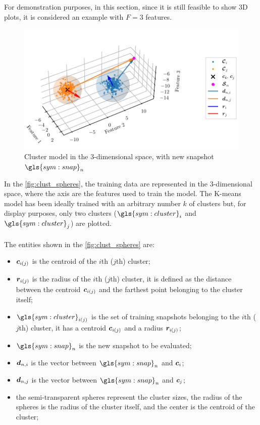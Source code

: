 For demonstration purposes, in this section, since it is still feasible to show 3D plots, it is considered an example with ${F}=3$ features.

\begin{figure}[htbp]
  \centering
  \includegraphics[width=\textwidth]{images/Spheres_2.pdf}
  \caption{Cluster model in the $3$-dimensional space, with new snapshot $\gls{sym:snap}_n$}
  \label{fig:clust_spheres}
\end{figure}

In the \autoref{fig:clust_spheres}, the training data are represented in the $3$-dimensional space, where the axis are the features used to train the model. The K-means model has been ideally trained with an arbitrary number $k$ of clusters but, for display purposes, only two clusters  ($\gls{sym:cluster}_i$ and $\gls{sym:cluster}_j$) are plotted.
\paragraph*{}
The entities shown in the \autoref{fig:clust_spheres} are:
\begin{itemize}
  \item $\bm{c}_{i(j)}$ is the centroid of the $i$th ($j$th) cluster;
  \item $\bm{r}_{i(j)}$ is the radius of the $i$th ($j$th) cluster, it is defined as the distance between the centroid $\bm{c}_{i(j)}$ and the farthest point belonging to the cluster itself;
  \item $\gls{sym:cluster}_{i(j)}$ is the set of training snapshots belonging to the $i$th ($j$th) cluster, it has a centroid $\bm{c}_{i(j)}$ and a radius $\bm{r}_{i(j)}$;
  \item $\gls{sym:snap}_n$ is the new snapshot to be evaluated;
  \item $\bm{d}_{n,i}$ is the vector between $\gls{sym:snap}_n$ and $\bm{c}_i$;
  \item $\bm{d}_{n,j}$ is the vector between $\gls{sym:snap}_n$ and $\bm{c}_j$;
  \item the semi-transparent spheres represent the cluster sizes, the radius of the spheres is the radius of the cluster itself, and the center is the centroid of the cluster;
\end{itemize}



